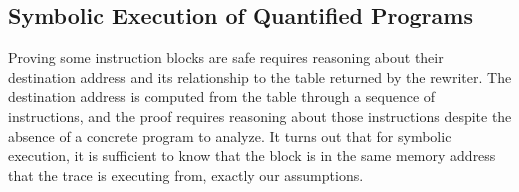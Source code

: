
\subsection{Symbolic Execution of Quantified Programs}

Proving some instruction blocks are safe requires reasoning about their destination address and its relationship to the table returned by the rewriter.
The destination address is computed from the table through a sequence of instructions, and the proof requires reasoning about those instructions despite the absence of a concrete program to analyze.
It turns out that for symbolic execution, it is sufficient to know that the block is in the same memory address that the trace is executing from, exactly our assumptions.


